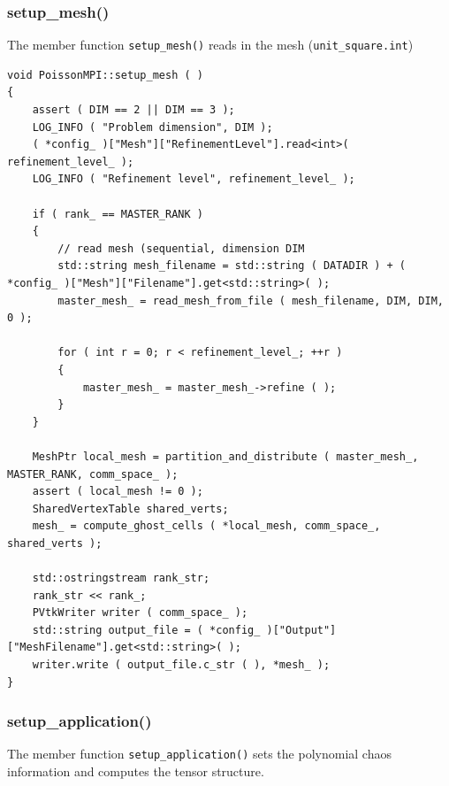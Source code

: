 \documentclass{article}
\begin{document}
\subsubsection{setup\_mesh()}

The member function \texttt{setup\_mesh()} reads in the mesh (\texttt{unit\_square.int})

\begin{lstlisting}
void PoissonMPI::setup_mesh ( )
{
    assert ( DIM == 2 || DIM == 3 );
    LOG_INFO ( "Problem dimension", DIM );
    ( *config_ )["Mesh"]["RefinementLevel"].read<int>( refinement_level_ );
    LOG_INFO ( "Refinement level", refinement_level_ );

    if ( rank_ == MASTER_RANK )
    {
        // read mesh (sequential, dimension DIM
        std::string mesh_filename = std::string ( DATADIR ) + ( *config_ )["Mesh"]["Filename"].get<std::string>( );
        master_mesh_ = read_mesh_from_file ( mesh_filename, DIM, DIM, 0 );

        for ( int r = 0; r < refinement_level_; ++r )
        {
            master_mesh_ = master_mesh_->refine ( );
        }
    }

    MeshPtr local_mesh = partition_and_distribute ( master_mesh_, MASTER_RANK, comm_space_ );
    assert ( local_mesh != 0 );
    SharedVertexTable shared_verts;
    mesh_ = compute_ghost_cells ( *local_mesh, comm_space_, shared_verts );

    std::ostringstream rank_str;
    rank_str << rank_;
    PVtkWriter writer ( comm_space_ );
    std::string output_file = ( *config_ )["Output"]["MeshFilename"].get<std::string>( );
    writer.write ( output_file.c_str ( ), *mesh_ );
}
\end{lstlisting}


\subsubsection{setup\_application()}

The member function \texttt{setup\_application()} sets the polynomial chaos information and computes the tensor structure.
\end{document}
